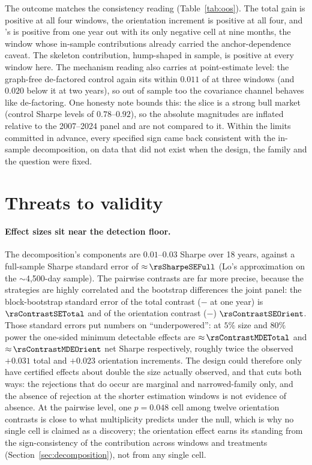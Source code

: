 The outcome matches the consistency reading
(Table~\ref{tab:oos}). The total gain is positive at all four windows,
the \skelsem{} orientation increment is positive at all four, and
\orientsem{}'s is positive from one year out with its only negative
cell at nine months, the window whose in-sample contributions already
carried the anchor-dependence caveat. The skeleton contribution,
hump-shaped in sample, is positive at every window here. The mechanism
reading also carries at point-estimate level: the graph-free
de-factored control again sits within $0.011$ of \skelsem{} at three
windows (and $0.020$ below it at two years), so out of sample too the
covariance channel behaves like de-factoring. One honesty note bounds
this: the slice is a strong bull market (control Sharpe levels of
$0.78$--$0.92$), so the absolute magnitudes are inflated relative to
the 2007--2024 panel and are not compared to it. Within the limits
committed in advance, every specified sign
came back consistent with the in-sample decomposition, on data that did
not exist when the design, the family and the question were fixed.

\section{Threats to validity}
\label{sec:believe}

\paragraph{Effect sizes sit near the detection floor.} The decomposition's
components are $0.01$--$0.03$ Sharpe over 18 years, against a full-sample
Sharpe standard error of ${\approx}\,\rsSharpeSEFull$ (Lo's
approximation on the $\sim$4{,}500-day sample). The pairwise contrasts
are far more precise, because the strategies are highly
correlated and the bootstrap differences the joint panel: the
block-bootstrap standard error of the total contrast
(\skelsem{}$-$\HRP{} at one year) is $\rsContrastSETotal$ and of the
orientation contrast (\orientsem{}$-$\skelsamp{}) $\rsContrastSEOrient$.
Those standard errors put numbers on ``underpowered'': at $5\%$ size and
$80\%$ power the one-sided minimum detectable effects are
${\approx}\,\rsContrastMDETotal$ and ${\approx}\,\rsContrastMDEOrient$
net Sharpe respectively, roughly twice the observed $+0.031$ total and
$+0.023$ orientation increments. The design could therefore only have
certified effects about double the size actually observed, and that cuts
both ways: the
rejections that do occur are marginal and narrowed-family only, and the
absence of rejection at
the shorter estimation windows is not evidence of absence. At the pairwise level, one
$p=0.048$ cell among twelve orientation contrasts is close to what
multiplicity predicts under the null, which is why no single cell is
claimed as a discovery; the orientation effect earns its standing from
the sign-consistency of the contribution across windows and treatments
(Section~\ref{sec:decomposition}), not from any single cell.


